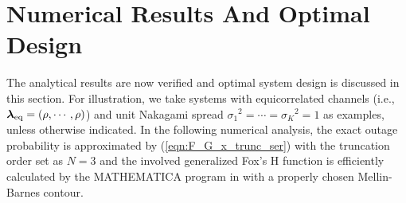 \documentclass[12pt,onecolumn,draftcls]{IEEEtran}
\newcommand{\bs}{\boldsymbol}
\begin{document}
\section{Numerical Results And Optimal Design} \label{sec:num_res}
The analytical results are now verified and optimal system design is discussed in this section. For illustration, we take systems with equicorrelated channels (i.e., $\bs \lambda_{\rm eq}=(\rho,\cdots,\rho)$) \cite{alouini2001sum,aalo1995performance,chen2004distribution} and unit Nakagami spread ${\sigma_1}^2=\cdots={\sigma_K}^2=1$ as examples, unless otherwise indicated. %
In the following numerical analysis, the exact outage probability is approximated by (\ref{eqn:F_G_x_trunc_ser}) with the truncation order set as $N=3$ and the involved generalized Fox's H function is efficiently calculated by the MATHEMATICA{\textregistered} program in \cite{yilmaz2010outage} with a properly chosen Mellin-Barnes contour.



\end{document}

